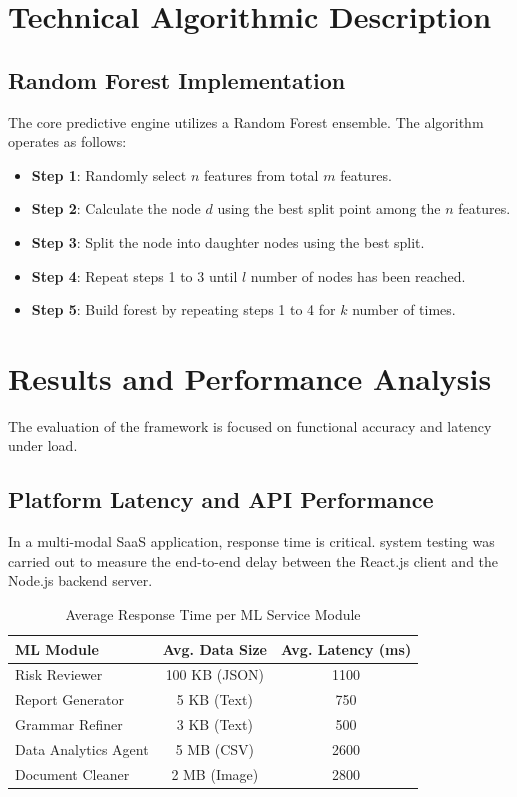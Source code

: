\documentclass[conference]{IEEEtran}
\begin{document}
\section{Technical Algorithmic Description}
\subsection{Random Forest Implementation}
The core predictive engine utilizes a Random Forest ensemble. The algorithm operates as follows:
\begin{itemize}
    \item \textbf{Step 1}: Randomly select $n$ features from total $m$ features.
    \item \textbf{Step 2}: Calculate the node $d$ using the best split point among the $n$ features.
    \item \textbf{Step 3}: Split the node into daughter nodes using the best split.
    \item \textbf{Step 4}: Repeat steps 1 to 3 until $l$ number of nodes has been reached.
    \item \textbf{Step 5}: Build forest by repeating steps 1 to 4 for $k$ number of times.
\end{itemize}

\section{Results and Performance Analysis}
The evaluation of the framework is focused on functional accuracy and latency under load.

\subsection{Platform Latency and API Performance}
In a multi-modal SaaS application, response time is critical. system testing was carried out to measure the end-to-end delay between the React.js client and the Node.js backend server.

\begin{table}[htbp]
\caption{Average Response Time per ML Service Module}
\begin{center}
\begin{tabular}{|l|c|c|}
\hline
\textbf{ML Module} & \textbf{Avg. Data Size} & \textbf{Avg. Latency (ms)} \\
\hline
Risk Reviewer & 100 KB (JSON) & 1100 \\
\hline
Report Generator & 5 KB (Text) & 750 \\
\hline
Grammar Refiner & 3 KB (Text) & 500 \\
\hline
Data Analytics Agent & 5 MB (CSV) & 2600 \\
\hline
Document Cleaner & 2 MB (Image) & 2800 \\
\hline
\end{tabular}
\label{tab:latency}
\end{center}
\end{table}
\end{document}
